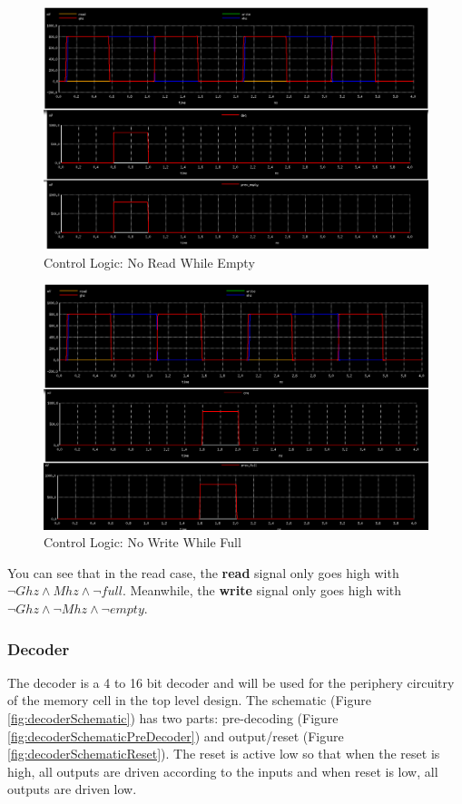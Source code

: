 \documentclass[a4paper]{article}
\begin{document}
\begin{figure}[H]
	\centering
	\includegraphics[scale=0.3]{controlReadNot}
	\caption{Control Logic: No Read While Empty}
	\label{fig:controlReadNot}
\end{figure}

\begin{figure}[H]
	\centering
	\includegraphics[scale=0.3]{controlWriteNot}
	\caption{Control Logic: No Write While Full}
	\label{fig:controlWriteNot}
\end{figure}

You can see that in the read case, the \textbf{read} signal only goes high with $\neg{Ghz} \wedge Mhz \wedge \neg{full}$. Meanwhile, the \textbf{write} signal only goes high with $\neg{Ghz} \wedge \neg{Mhz} \wedge \neg{empty}$.



\subsubsection{Decoder}
\label{sec:decoder_design}
The decoder is a 4 to 16 bit decoder and will be used for the periphery circuitry of the memory cell in the top level design. The schematic (Figure \ref{fig:decoderSchematic}) has two parts: pre-decoding (Figure \ref{fig:decoderSchematicPreDecoder}) and output/reset (Figure \ref{fig:decoderSchematicReset}). The reset is active low so that when the reset is high, all outputs are driven according to the inputs and when reset is low, all outputs are driven low. 
\end{document}

